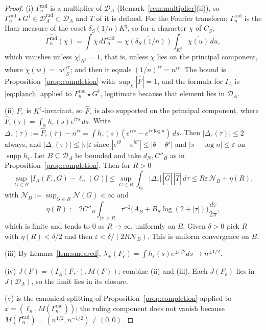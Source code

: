 \documentclass[11pt]{amsart}
\theoremstyle{definition}
\theoremstyle{remark}
\newcommand{\R}{\mathbb R}
\newcommand{\supp}{\operatorname{supp}}
\newcommand{\Knat}{K^{\natural}}
\newcommand{\Drad}{\mathcal D_A^{\mathrm{rad}}}
\newcommand{\DA}{\mathcal D_A}
\begin{document}
\begin{proof}
(i) $\Gamma_n^{\mathrm{rad}}$ is a multiplier of $\DA$
(Remark~\ref{rem:multiplier}(ii)), so
$\Gamma_n^{\mathrm{rad}}\star G^\dagger\in\Drad\subset\DA$ and $T$ of it is
defined. For the Fourier transform: $\Gamma_n^{\mathrm{rad}}$ is the Haar
measure of the coset $\delta_S(1/n)\Knat$, so for a character $\chi$ of $C_S$,
\[
  \widehat{\Gamma_n^{\mathrm{rad}}}(\chi)
   =\int\overline\chi\,d\Gamma_n^{\mathrm{rad}}
   =\overline{\chi(\delta_S(1/n))}\int_{\Knat}\overline{\chi(u)}\,du,
\]
which vanishes unless $\chi|_{\Knat}=1$, that is, unless $\chi$ lies on the
principal component, where $\chi(w)=|w|_S^{i\tau}$; and then it equals
$\overline{(1/n)^{i\tau}}=n^{i\tau}$. The bound is
Proposition~\ref{prop:completion} with $\sup_\chi|\widehat F|=1$, and the
formula for $I_A$ is \eqref{eq:planch} applied to
$\Gamma_n^{\mathrm{rad}}\star G^\dagger$, legitimate because that element lies
in $\DA$.

(ii) $F_\varepsilon$ is $\Knat$-invariant, so $\widehat F_\varepsilon$ is also
supported on the principal component, where
$\widehat F_\varepsilon(\tau)=\int_\R h_\varepsilon(s)e^{i\tau s}\,ds$. Write
$\Delta_\varepsilon(\tau):=\widehat F_\varepsilon(\tau)-n^{i\tau}
=\int h_\varepsilon(s)(e^{i\tau s}-e^{i\tau\log n})\,ds$. Then
$|\Delta_\varepsilon(\tau)|\le2$ always, and
$|\Delta_\varepsilon(\tau)|\le|\tau|\varepsilon$ since
$|e^{i\theta}-e^{i\theta'}|\le|\theta-\theta'|$ and $|s-\log n|\le\varepsilon$
on $\supp h_\varepsilon$. Let $B\subseteq\DA$ be bounded and take $d_N,C''_B$
as in Proposition~\ref{prop:completion}. Then for $R>0$
\[
  \sup_{G\in B}\bigl|I_A(F_\varepsilon,G)-\ell_n(G)\bigr|
   \le\sup_{G\in B}\int_{\mathfrak c_0}|\Delta_\varepsilon|\,|\widehat G|\,
     |\widehat T|\,d\tau
   \le R\varepsilon\,\mathcal N_B+\eta(R),
\]
with $\mathcal N_B:=\sup_{G\in B}\mathcal N(G)<\infty$ and
\[
  \eta(R):=2C''_B\int_{|\tau|>R}\tau^{-2}\bigl(A_B+B_S\log(2+|\tau|)\bigr)
    \frac{d\tau}{2\pi},
\]
which is finite and tends to $0$ as $R\to\infty$, uniformly on $B$. Given
$\delta>0$ pick $R$ with $\eta(R)<\delta/2$ and then
$\varepsilon<\delta/(2R\mathcal N_B)$. This is uniform convergence on $B$.

(iii) By Lemma~\ref{lem:smeared},
$\lambda_\mp(F_\varepsilon)=\int h_\varepsilon(s)e^{\pm s/2}ds\to n^{\pm1/2}$.

(iv) $J(F)=(I_A(F,\cdot),M(F))$; combine (ii) and (iii). Each
$J(F_\varepsilon)$ lies in $J(\DA)$, so the limit lies in its closure.

(v) is the canonical splitting of Proposition~\ref{prop:completion} applied to
$x=(\ell_n,M(\Gamma_n^{\mathrm{rad}}))$; the ruling component does not vanish
because $M(\Gamma_n^{\mathrm{rad}})=(n^{1/2},n^{-1/2})\ne(0,0)$.
\end{proof}
\end{document}
